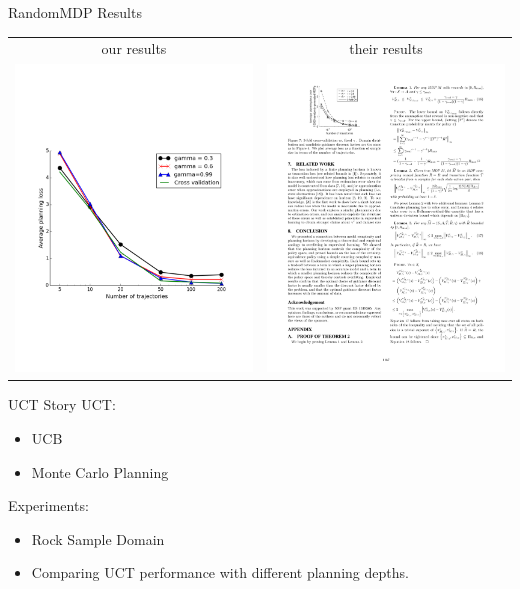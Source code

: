 \documentclass{beamer}
\begin{document}
\begin{frame}{RandomMDP Results}
\begin{tabular}{cc}
our results & their results \\
	\includegraphics[page=1,height=.55\textheight,width=.5\textwidth]{../results/figure_2.pdf} &
	\includegraphics[page=1,width=.41\textwidth]{../results/originalCV.pdf}
\end{tabular}
\end{frame}



\begin{frame}{UCT Story}
UCT: 
\begin{itemize}
\item UCB
\item Monte Carlo Planning
\end{itemize}

Experiments:
\begin{itemize}
\item Rock Sample Domain
\item Comparing UCT performance with different planning depths.
\end{itemize}
\end{frame}
\end{document}
